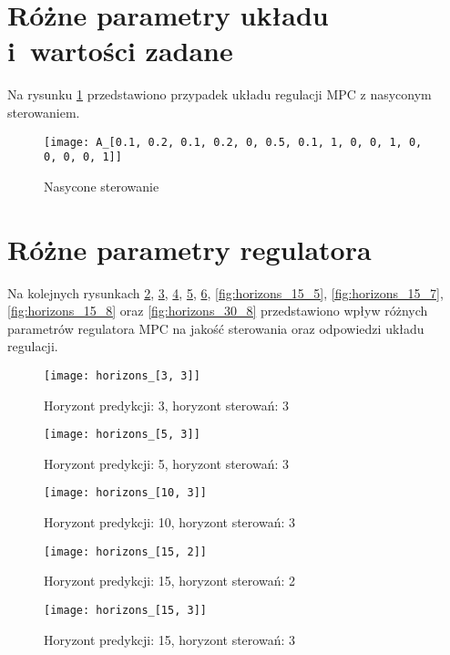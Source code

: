 \section{Różne parametry układu i~wartości zadane}
Na rysunku \ref{fig:saturated} przedstawiono przypadek układu regulacji MPC
z nasyconym sterowaniem.
\begin{figure}[p]
    \centering
	\texttt{[image: A\_[0.1, 0.2, 0.1, 0.2, 0, 0.5, 0.1, 1, 0, 0, 1, 0, 0, 0, 0, 1]]}
	\caption{Nasycone sterowanie}
	\label{fig:saturated}
\end{figure}

\section{Różne parametry regulatora}
Na kolejnych rysunkach \ref{fig:horizons_3_3}, \ref{fig:horizons_5_3}, \ref{fig:horizons_10_3},
\ref{fig:horizons_15_2}, \ref{fig:horizons_15_3}, \ref{fig:horizons_15_5}, \ref{fig:horizons_15_7},
\ref{fig:horizons_15_8} oraz \ref{fig:horizons_30_8} przedstawiono wpływ różnych parametrów regulatora MPC
na jakość sterowania oraz odpowiedzi układu regulacji. 
\begin{figure}[p]
    \centering
	\texttt{[image: horizons\_[3, 3]]}
	\caption{Horyzont predykcji: 3, horyzont sterowań: 3}
	\label{fig:horizons_3_3}
\end{figure}

\begin{figure}[p]
    \centering
	\texttt{[image: horizons\_[5, 3]]}
	\caption{Horyzont predykcji: 5, horyzont sterowań: 3}
	\label{fig:horizons_5_3}
\end{figure}

\begin{figure}[p]
    \centering
	\texttt{[image: horizons\_[10, 3]]}
	\caption{Horyzont predykcji: 10, horyzont sterowań: 3}
	\label{fig:horizons_10_3}
\end{figure}

\begin{figure}[p]
    \centering
	\texttt{[image: horizons\_[15, 2]]}
	\caption{Horyzont predykcji: 15, horyzont sterowań: 2}
	\label{fig:horizons_15_2}
\end{figure}

\begin{figure}[p]
    \centering
	\texttt{[image: horizons\_[15, 3]]}
	\caption{Horyzont predykcji: 15, horyzont sterowań: 3}
	\label{fig:horizons_15_3}
\end{figure}

